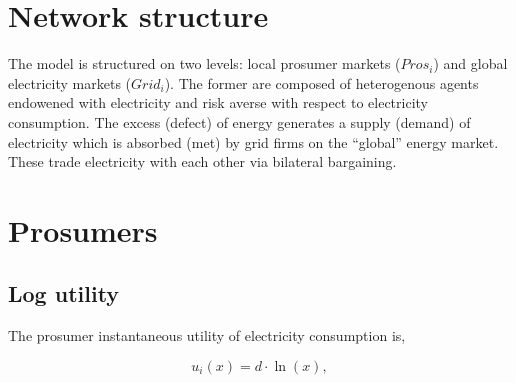 \documentclass[american]{scrartcl}
\begin{document}
\section{Network structure}

\begin{minipage}{0.45\textwidth}{
		}\end{minipage} \hfill
\begin{minipage}{0.5\textwidth}{
		The model is structured on two levels: local prosumer markets ($Pros_i$) and global electricity markets ($Grid_i$). The former are composed of heterogenous agents endowened with electricity and risk averse with respect to electricity consumption. The excess (defect) of energy generates a supply (demand) of electricity which is absorbed (met) by grid firms on the ``global'' energy market. These trade electricity with each other via bilateral bargaining.
	}
\end{minipage}

\section{Prosumers}

\subsection{Log utility}

The prosumer instantaneous utility of electricity consumption is,

\begin{equation*}
	u_i(x) = d \cdot \ln(x),
\end{equation*}
\end{document}
